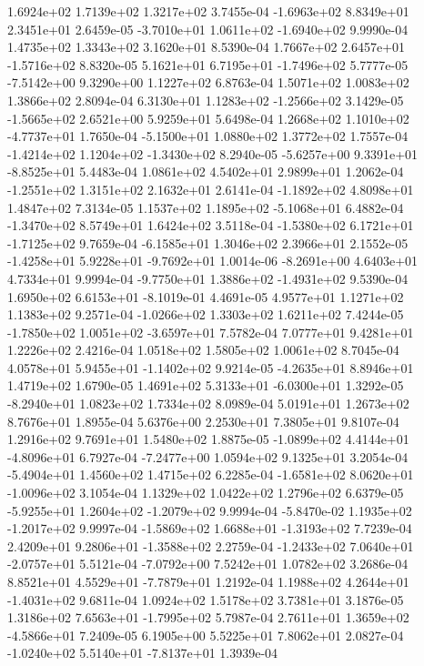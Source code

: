 1.6924e+02 1.7139e+02 1.3217e+02  3.7455e-04
-1.6963e+02  8.8349e+01  2.3451e+01  2.6459e-05
-3.7010e+01  1.0611e+02 -1.6940e+02  9.9990e-04
1.4735e+02 1.3343e+02 3.1620e+01  8.5390e-04
 1.7667e+02  2.6457e+01 -1.5716e+02  8.8320e-05
 5.1621e+01  6.7195e+01 -1.7496e+02  5.7777e-05
-7.5142e+00  9.3290e+00  1.1227e+02  6.8763e-04
1.5071e+02 1.0083e+02 1.3866e+02  2.8094e-04
 6.3130e+01  1.1283e+02 -1.2566e+02  3.1429e-05
-1.5665e+02  2.6521e+00  5.9259e+01  5.6498e-04
 1.2668e+02  1.1010e+02 -4.7737e+01  1.7650e-04
-5.1500e+01  1.0880e+02  1.3772e+02  1.7557e-04
-1.4214e+02  1.1204e+02 -1.3430e+02  8.2940e-05
-5.6257e+00  9.3391e+01 -8.8525e+01  5.4483e-04
1.0861e+02 4.5402e+01 2.9899e+01  1.2062e-04
-1.2551e+02  1.3151e+02  2.1632e+01  2.6141e-04
-1.1892e+02  4.8098e+01  1.4847e+02  7.3134e-05
 1.1537e+02  1.1895e+02 -5.1068e+01  6.4882e-04
-1.3470e+02  8.5749e+01  1.6424e+02  3.5118e-04
-1.5380e+02  6.1721e+01 -1.7125e+02  9.7659e-04
-6.1585e+01  1.3046e+02  2.3966e+01  2.1552e-05
-1.4258e+01  5.9228e+01 -9.7692e+01  1.0014e-06
-8.2691e+00  4.6403e+01  4.7334e+01  9.9994e-04
-9.7750e+01  1.3886e+02 -1.4931e+02  9.5390e-04
 1.6950e+02  6.6153e+01 -8.1019e-01  4.4691e-05
4.9577e+01 1.1271e+02 1.1383e+02  9.2571e-04
-1.0266e+02  1.3303e+02  1.6211e+02  7.4244e-05
-1.7850e+02  1.0051e+02 -3.6597e+01  7.5782e-04
7.0777e+01 9.4281e+01 1.2226e+02  2.4216e-04
1.0518e+02 1.5805e+02 1.0061e+02  8.7045e-04
 4.0578e+01  5.9455e+01 -1.1402e+02  9.9214e-05
-4.2635e+01  8.8946e+01  1.4719e+02  1.6790e-05
 1.4691e+02  5.3133e+01 -6.0300e+01  1.3292e-05
-8.2940e+01  1.0823e+02  1.7334e+02  8.0989e-04
5.0191e+01 1.2673e+02 8.7676e+01  1.8955e-04
5.6376e+00 2.2530e+01 7.3805e+01  9.8107e-04
1.2916e+02 9.7691e+01 1.5480e+02  1.8875e-05
-1.0899e+02  4.4144e+01 -4.8096e+01  6.7927e-04
-7.2477e+00  1.0594e+02  9.1325e+01  3.2054e-04
-5.4904e+01  1.4560e+02  1.4715e+02  6.2285e-04
-1.6581e+02  8.0620e+01 -1.0096e+02  3.1054e-04
1.1329e+02 1.0422e+02 1.2796e+02  6.6379e-05
-5.9255e+01  1.2604e+02 -1.2079e+02  9.9994e-04
-5.8470e-02  1.1935e+02 -1.2017e+02  9.9997e-04
-1.5869e+02  1.6688e+01 -1.3193e+02  7.7239e-04
 2.4209e+01  9.2806e+01 -1.3588e+02  2.2759e-04
-1.2433e+02  7.0640e+01 -2.0757e+01  5.5121e-04
-7.0792e+00  7.5242e+01  1.0782e+02  3.2686e-04
 8.8521e+01  4.5529e+01 -7.7879e+01  1.2192e-04
 1.1988e+02  4.2644e+01 -1.4031e+02  9.6811e-04
1.0924e+02 1.5178e+02 3.7381e+01  3.1876e-05
 1.3186e+02  7.6563e+01 -1.7995e+02  5.7987e-04
 2.7611e+01  1.3659e+02 -4.5866e+01  7.2409e-05
6.1905e+00 5.5225e+01 7.8062e+01  2.0827e-04
-1.0240e+02  5.5140e+01 -7.8137e+01  1.3939e-04
